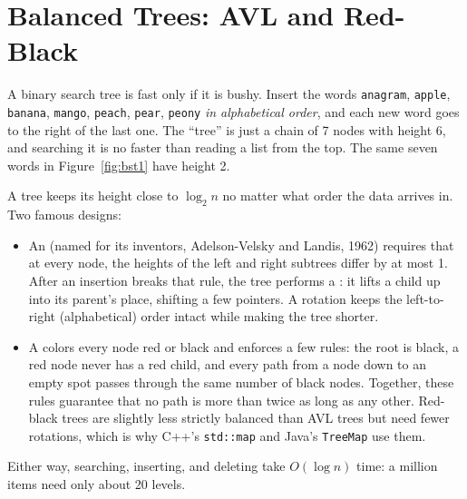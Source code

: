 \section{Balanced Trees: AVL and Red-Black}

A binary search tree is fast only if it is bushy. Insert the words
\texttt{anagram}, \texttt{apple}, \texttt{banana}, \texttt{mango},
\texttt{peach}, \texttt{pear}, \texttt{peony} \emph{in alphabetical order},
and each new word goes to the right of the last one. The ``tree'' is just
a chain of 7 nodes with height 6, and searching it is no faster than
reading a list from the top. The same seven words in Figure~\ref{fig:bst1}
have height 2.

A  tree keeps its height close to $\log_2 n$ no matter
what order the data arrives in. Two famous designs:

\begin{itemize}
\item An  (named for its inventors,
Adelson-Velsky and Landis, 1962) requires that at every node, the heights
of the left and right subtrees differ by at most 1. After an insertion
breaks that rule, the tree performs a : it lifts a child up into its parent's place, shifting a few
pointers. A rotation keeps the left-to-right (alphabetical) order intact
while making the tree shorter.
\item A  colors every node
red or black and enforces a few rules: the root is black, a red node never
has a red child, and every path from a node down to an empty spot passes
through the same number of black nodes. Together, these rules guarantee
that no path is more than twice as long as any other. Red-black trees are
slightly less strictly balanced than AVL trees but need fewer rotations,
which is why C++'s \texttt{std::map} and Java's \texttt{TreeMap} use them.
\end{itemize}

Either way, searching, inserting, and deleting take $O(\log n)$ time: a
million items need only about 20 levels.

